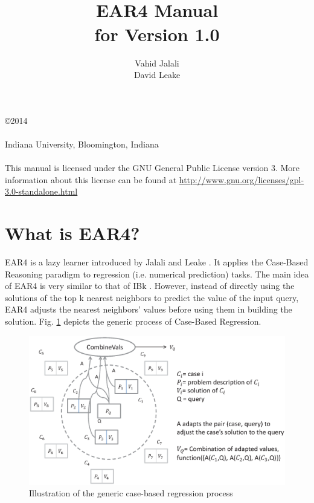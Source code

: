 \documentclass[a4paper]{article}
\title{\epsfig{file=figures/IUB.eps,width=10cm}\vspace{3cm}\\EAR4 Manual\\for Version 1.0}
\author{Vahid Jalali\\David Leake}
\begin{document}
\begin{titlepage}
\maketitle

\thispagestyle{empty}
\center
\begin{table}[b]
\copyright 2014 \\
 \\
Indiana University, Bloomington, Indiana \\
\\
This manual is licensed under the GNU General Public License version 3. More information about this license 
can be found at \url{http://www.gnu.org/licenses/gpl-3.0-standalone.html}
\end{table}

\end{titlepage}


\section{What is EAR4?}
EAR4 is a lazy learner introduced by Jalali and Leake \cite{jalali-Leake13-2}. It applies the
Case-Based Reasoning \cite{mantaras-et-al05} paradigm to regression (i.e. numerical prediction) tasks.
The main idea of EAR4 is very similar to that of IBk \cite{aha91}. 
However, instead of directly using the solutions of the top k nearest neighbors to predict the value
of the input query, EAR4 adjusts the nearest neighbors' values before using them in building 
the solution. Fig. \ref{fig:cbr} depicts the generic process of Case-Based Regression.

\begin{figure}[htb]
  \begin{center}
  \includegraphics[scale=0.5]{figures/cbr.eps}
  \caption{Illustration of the generic case-based regression process}
  \label{fig:cbr}
  \end{center}
\end{figure}
\end{document}
